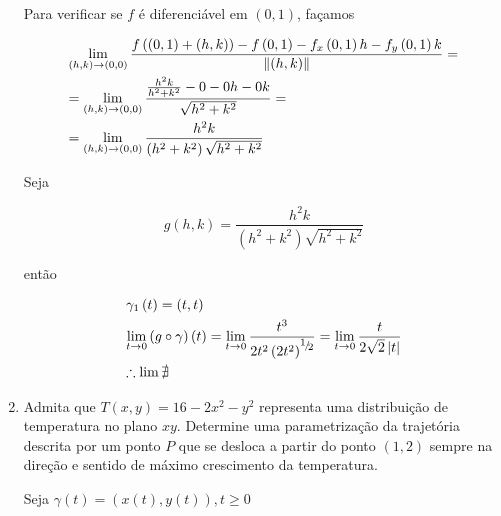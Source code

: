 \documentclass[11pt, oneside, a4paper]{gsm-l}
\begin{document}
\begin{enumerate}
\begin{sol}
Para verificar se $f$ é diferenciável em $(0,1)$, fa\c{c}amos

\[
\begin{gathered}
  \mathop {\lim }\limits_{\left( {h,k} \right) \to \left( {0,0} \right)} \frac{{f\left( {\left( {0,1} \right) + \left( {h,k} \right)} \right) - f\left( {0,1} \right) - f_x \left( {0,1} \right)h - f_y \left( {0,1} \right)k}}
{{\left\| {\left( {h,k} \right)} \right\|}} =  \hfill \\
   = \mathop {\lim }\limits_{\left( {h,k} \right) \to \left( {0,0} \right)} \frac{{\frac{{h^2 k}}
{{h^2  + k^2 }} - 0 - 0h - 0k}}
{{\sqrt {h^2  + k^2 } }} =  \hfill \\
   = \mathop {\lim }\limits_{\left( {h,k} \right) \to \left( {0,0} \right)} \frac{{h^2 k}}
{{\left( {h^2  + k^2 } \right)\sqrt {h^2  + k^2 } }} \hfill \\
\end{gathered}
\]

Seja

\[
g\left( {h,k} \right) = \frac{{h^2 k}}
{{\left( {h^2  + k^2 } \right)\sqrt {h^2  + k^2 } }}
\]

então

\[
\begin{gathered}
  \gamma _1 \left( t \right) = \left( {t,t} \right) \hfill \\
  \mathop {\lim }\limits_{t \to 0} \left( {g \circ \gamma } \right)\left( t \right) = \mathop {\lim }\limits_{t \to 0} \frac{{t^3 }}
{{2t^2 \left( {2t^2 } \right)^{{\raise0.5ex\hbox{$\scriptstyle 1$}
\kern-0.1em/\kern-0.15em
\lower0.25ex\hbox{$\scriptstyle 2$}}} }} = \mathop {\lim }\limits_{t \to 0} \frac{t}
{{2\sqrt 2 \left| t \right|}} \hfill \\
  \therefore \lim \nexists  \hfill \\
\end{gathered}
\]

\end{sol}

  \item Admita que $T(x,y) = 16-2x^2-y^2$ representa uma distribui\c{c}ão de temperatura no plano $xy$. Determine uma parametriza\c{c}ão da trajet\'oria descrita por um ponto $P$ que se desloca a partir do ponto $(1,2)$ sempre na dire\c{c}ão e sentido de máximo crescimento da temperatura.

\begin{sol}
Seja $\gamma \left( t \right) = \left( {x\left( t \right),y\left( t \right)} \right),t \geqslant 0$


\end{sol}
\end{enumerate}
\end{document}
